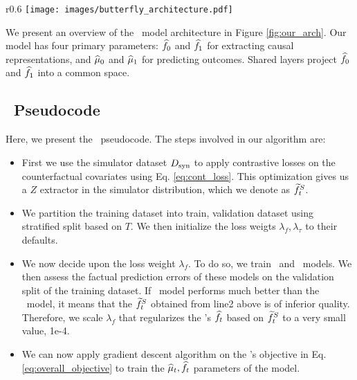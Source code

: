 \begin{wrapfigure}{r}{0.6\textwidth} %
    \centering
    \vspace{-10pt} 
    \texttt{[image: images/butterfly\_architecture.pdf]} %
    \caption{\small{\our's model architecture.}}
    \vspace{-10pt} 
    \label{fig:our_arch}
\end{wrapfigure}
We present an overview of the \our\ model architecture in Figure \ref{fig:our_arch}. Our model has four primary parameters: $\widehat{f}_0$ and $\widehat{f}_1$ for extracting causal representations, and $\widehat{\mu}_0$ and $\widehat{\mu}_1$ for predicting outcomes. Shared layers project $\widehat{f}_0$ and $\widehat{f}_1$ into a common space.


\subsection{\our\ Pseudocode}
Here, we present the \our\ pseudocode. The steps involved in our algorithm are:
\begin{itemize}[leftmargin=1.5cm]
    \item[line 1] First we use the simulator dataset $D_{\text{syn}}$ to apply contrastive losses on the counterfactual covariates using Eq. \ref{eq:cont_loss}. This optimization gives us a $Z$ extractor in the simulator distribution, which we denote as $\widetilde{f}^S_t$.
    \item[line 2] We partition the training dataset into train, validation dataset using stratified split based on $T$. We then initialize the loss weigts $\lambda_f, \lambda_\tau$ to their defaults.
    \item[lines 4,5] We now decide upon the loss weight $\lambda_f$. To do so, we train \realonly\ and \muonly\ models. We then assess the factual prediction errors of these models on the validation split of the training dataset. If \realonly\ model performs much better than the \muonly\ model, it means that the $\widetilde{f}^S_t$ obtained from line2 above is of inferior quality. Therefore, we scale $\lambda_f$ that regularizes the \our's $\widehat{f}_t$ based on $\widetilde{f}^S_t$ to a very small value, 1e-4.
    \item[line 6] We can now apply gradient descent algorithm on the \our's objective in Eq. \ref{eq:overall_objective} to train the $\widehat{\mu}_t, \widehat{f}_t$ parameters of the model.
\end{itemize}

